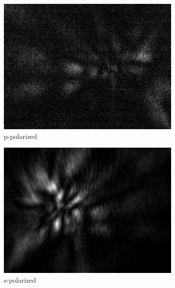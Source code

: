 \begin{figure}[!h]
\centering
  \begin{subfigure}[b]{0.2\textwidth}
    \includegraphics[width=\textwidth]{diffraction_image/2015040117594700171-1}
    \caption{p-polarized}
  \end{subfigure}
  \begin{subfigure}[b]{0.2\textwidth}
    \includegraphics[width=\textwidth]{diffraction_image/2015040117594700171-2}
    \caption{s-polarized}
  \end{subfigure}
  \begin{subfigure}[b]{0.2\textwidth}

\end{subfigure}
\end{figure}

